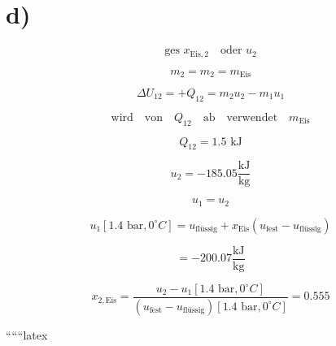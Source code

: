 

\section*{d)}

\[
\text{ges } x_{\text{Eis},2} \quad \text{oder } u_2
\]

\[
m_2 = m_2 = m_{\text{Eis}}
\]

\[
\Delta U_{12} = + Q_{12} = m_2 u_2 - m_1 u_1
\]

\[
\text{wird} \quad \text{von} \quad Q_{12} \quad \text{ab} \quad \text{verwendet} \quad m_{\text{Eis}}
\]

\[
Q_{12} = 1.5 \text{ kJ}
\]

\[
u_2 = -185.05 \frac{\text{kJ}}{\text{kg}}
\]

\[
u_1 = u_2
\]

\[
u_1 [1.4 \text{ bar}, 0^\circ C] = u_{\text{flüssig}} + x_{\text{Eis}} (u_{\text{fest}} - u_{\text{flüssig}})
\]

\[
= -200.07 \frac{\text{kJ}}{\text{kg}}
\]

\[
x_{2, \text{Eis}} = \frac{u_2 - u_{1} [1.4 \text{ bar}, 0^\circ C]}{(u_{\text{fest}} - u_{\text{flüssig}}) [1.4 \text{ bar}, 0^\circ C]} = 0.555
\]

``````latex